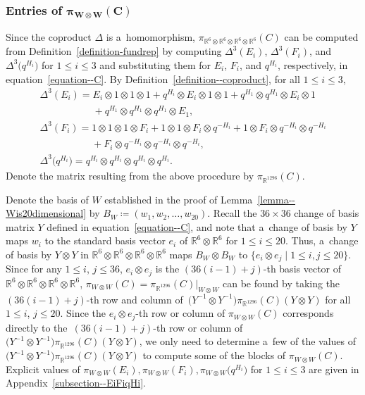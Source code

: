 \documentclass[pdftex]{sigma}
\numberwithin{equation}{section}
\theoremstyle{definition}
\begin{document}
\subsubsection[Entries of pi(W tensor W)(C)]{Entries of $\boldsymbol{\pi_{W \otimes W}(C)}$}
Since the coproduct $\Delta$ is a~homomorphism, $\pi_{\mathbb{R}^6 \otimes \mathbb{R}^6 \otimes \mathbb{R}^6 \otimes \mathbb{R}^6}(C)$ can be computed from Definition~\ref{definition-fundrep} by computing $\Delta^3(E_i)$, $\Delta^3(F_i)$, and $\Delta^3\bigl(q^{H_i}\bigr)$ for $1 \le i \le 3$ and substituting them for $E_i$, $F_i$, and $q^{H_i}$, respectively, in equation~\eqref{equation--C}. By Definition~\ref{definition--coproduct}, for all $1 \le i \le 3$,
\begin{gather*}
 \Delta^3 (E_i) = E_i \otimes 1 \otimes 1 \otimes 1 + q^{H_i} \otimes E_i \otimes 1 \otimes 1 + q^{H_1} \otimes q^{H_1} \otimes E_i \otimes 1\\
 \phantom{ \Delta^3 (E_i) =}{}+ q^{H_1} \otimes q^{H_1} \otimes q^{H_1} \otimes E_1 ,\\
 \Delta^3 (F_i) = 1 \otimes 1 \otimes 1 \otimes F_i + 1 \otimes 1 \otimes F_i \otimes q^{-H_i} + 1 \otimes F_i \otimes q^{-H_i} \otimes q^{-H_i}\\
 \phantom{\Delta^3 (F_i) =}{}+ F_i \otimes q^{-H_i} \otimes q^{-H_i} \otimes q^{-H_i} ,\\
 \Delta^3 \bigl(q^{H_i}\bigr) = q^{H_i} \otimes q^{H_i} \otimes q^{H_i} \otimes q^{H_i}.
\end{gather*}
Denote the matrix resulting from the above procedure by $\pi_{\mathbb{R}^{1296}} (C)$.


Denote the basis of $W$ established in the proof of Lemma~\ref{lemma--Wis20dimensional} by $B_W \coloneqq (w_1,w_2,\dots,w_{20})$. Recall the $36 \times 36$ change of basis matrix $Y$ defined in equation~\eqref{equation--C}, and note that a~change of basis by $Y$ maps $w_i$ to the standard basis vector $e_i$ of $\mathbb{R}^6 \otimes \mathbb{R}^6$ for $1 \le i \le 20$. Thus, a~change of basis by $Y \otimes Y$ in $\mathbb{R}^6 \otimes \mathbb{R}^6 \otimes \mathbb{R}^6 \otimes \mathbb{R}^6$ maps $B_W \otimes B_W$ to $\{e_i \otimes e_j \mid 1 \le i,j \le 20\}$. Since for any $1 \le i$, $j \le 36$, $e_i \otimes e_j$ is the $(36(i-1)+j)$-th basis vector of $\mathbb{R}^6 \otimes \mathbb{R}^6 \otimes \mathbb{R}^6 \otimes \mathbb{R}^6$, $\pi_{W \otimes W}(C) = \pi_{\mathbb{R}^{1296}}(C) |_{W \otimes W}$ can be found by taking the $(36(i-1)+j)$-th row and column of~${\bigl(Y^{-1} \otimes Y^{-1}\bigr)\pi_{\mathbb{R}^{1296}}(C)(Y \otimes Y)}$ for all $1 \le i$, $j \le 20$. Since the $e_i \otimes e_j$-th row or column of $\pi_{W \otimes W}(C)$ corresponds directly to the~${(36(i-1)+j)}$-th row or column of $\bigl(Y^{-1} \otimes Y^{-1}\bigr)\pi_{\mathbb{R}^{1296}}(C)(Y \otimes Y)$, we only need to determine a~few of the values of $\bigl(Y^{-1} \otimes Y^{-1}\bigr)\pi_{\mathbb{R}^{1296}}(C)(Y \otimes Y)$ to compute some of the blocks of $\pi_{W \otimes W}(C)$. Explicit values of $\pi_{W \otimes W}(E_i),\pi_{W \otimes W}(F_i),\pi_{W \otimes W}\bigl(q^{H_i}\bigr)$ for $1 \le i \le 3$ are given in Appendix~\ref{subsection--EiFiqHi}.
\end{document}
